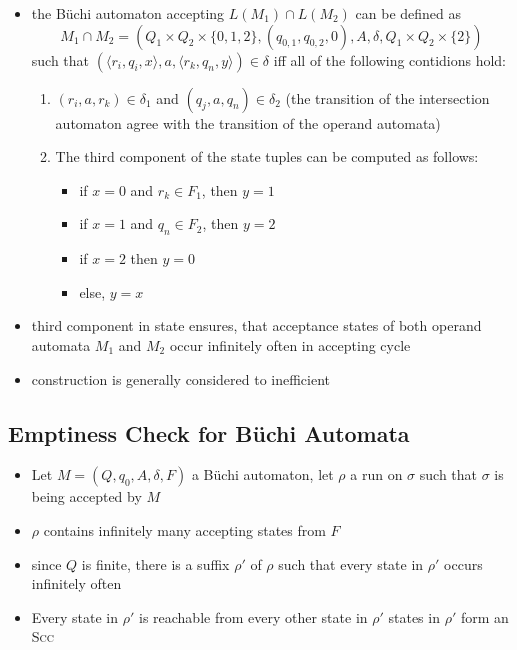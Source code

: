 \documentclass[a4paper, 10pt]{article}
\begin{document}
\begin{itemize}
\begin{itemize}
        \item the Büchi automaton accepting $L(M_1)\cap L(M_2)$ can be defined as \[ M_1\cap M_2 = (Q_1\times Q_2\times\{0,1,2\},(q_{0,1},q_{0,2},0),A,\delta,Q_1\times Q_2\times\{2\}) \] such that $(\langle r_i,q_i,x\rangle,a,\langle r_k,q_n,y\rangle)\in\delta$ iff all of the following contidions hold:
        \begin{enumerate}
            \item $(r_i,a,r_k)\in\delta_1$ and $(q_j,a,q_n)\in\delta_2$ (the transition of the intersection automaton agree with the transition of the operand automata)
            \item The third component of the state tuples can be computed as follows:
            \begin{itemize}
                \item if $x=0$ and $r_k\in F_1$, then $y=1$
                \item if $x=1$ and $q_n\in F_2$, then $y=2$
                \item if $x=2$ then $y=0$
                \item else, $y=x$
            \end{itemize}
        \end{enumerate}
        \item third component in state ensures, that acceptance states of both operand automata $M_1$ and $M_2$ occur infinitely often in accepting cycle
        \item construction is generally considered to inefficient
    \end{itemize}
\end{itemize}
\subsection*{Emptiness Check for Büchi Automata}
\begin{itemize}
    \item Let $M=(Q,q_0,A,\delta,F)$ a Büchi automaton, let $\rho$ a run on $\sigma$ such that $\sigma$ is being accepted by $M$
    \item $\rho$ contains infinitely many accepting states from $F$
    \item since $Q$ is finite, there is a suffix $\rho'$ of $\rho$ such that every state in $\rho'$ occurs infinitely often
    \item Every state in $\rho'$ is reachable from every other state in $\rho'$ \follows states in $\rho'$ form an \textsc{Scc}
\end{itemize}
\end{document}
